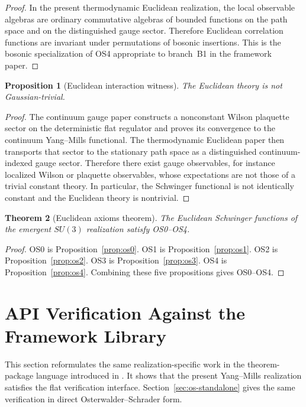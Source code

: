 \documentclass[11pt]{article}
\newtheorem{theorem}{Theorem}[section]
\newtheorem{proposition}[theorem]{Proposition}
\theoremstyle{definition}
\theoremstyle{remark}
\begin{document}
\begin{proof}
In the present thermodynamic Euclidean realization, the local observable
algebras are ordinary commutative algebras of bounded functions on the path
space and on the distinguished gauge sector.  Therefore Euclidean correlation
functions are invariant under permutations of bosonic insertions.  This is the
bosonic specialization of OS4 appropriate to branch~B1 in the framework paper.
\end{proof}

\begin{proposition}[Euclidean interaction witness]
\label{prop:nontriviality}
The Euclidean theory is not Gaussian-trivial.
\end{proposition}

\begin{proof}
The continuum gauge paper constructs a nonconstant Wilson plaquette sector on
the deterministic flat regulator and proves its convergence to the continuum
Yang--Mills functional.  The thermodynamic Euclidean paper then transports that
sector to the stationary path space as a distinguished continuum-indexed gauge
sector.  Therefore there exist gauge observables, for instance localized
Wilson or plaquette observables, whose expectations are not those of a trivial
constant theory.  In particular, the Schwinger functional is not identically
constant and the Euclidean theory is nontrivial.
\end{proof}

\begin{theorem}[Euclidean axioms theorem]
\label{thm:euclidean-axioms}
The Euclidean Schwinger functions of the emergent $SU(3)$ realization satisfy
OS0--OS4.
\end{theorem}

\begin{proof}
OS0 is Proposition~\ref{prop:os0}.
OS1 is Proposition~\ref{prop:os1}.
OS2 is Proposition~\ref{prop:os2}.
OS3 is Proposition~\ref{prop:os3}.
OS4 is Proposition~\ref{prop:os4}.
Combining these five propositions gives OS0--OS4.
\end{proof}

\section{API Verification Against the Framework Library}
\label{sec:api}

This section reformulates the same realization-specific work in the
theorem-package language introduced in \cite{axioms}.  It shows that the
present Yang--Mills realization satisfies the flat verification interface.
Section~\ref{sec:os-standalone} gives the same verification in direct
Osterwalder--Schrader form.
\end{document}
